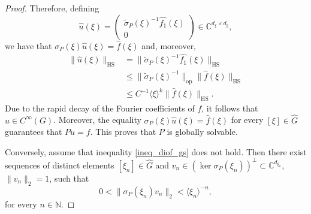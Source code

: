 \documentclass[10pt,a4paper]{amsart}
\newcommand{\C}{\mathbb{C}}
\newcommand{\HS}{\operatorname{HS}}
\newcommand{\N}{\mathbb{N}}
\begin{document}
\begin{proof}
Therefore, defining
\begin{equation*}
    \widehat{u}(\xi)=\begin{pmatrix}
        \tilde \sigma_P(\xi)^{-1}\widehat{f_1}(\xi)\\
        0
    \end{pmatrix}\in\C^{d_\xi\times d_\xi},
\end{equation*}
we have that $\sigma_P(\xi)\widehat{u}(\xi)=\widehat{f}(\xi)$ and, moreover,
\begin{align*}
    \|\widehat{u}(\xi)\|_{\HS}&=\| \tilde \sigma_P(\xi)^{-1}\widehat{f_1}(\xi)\|_{\HS}\\
    &\leq \| \tilde \sigma_P(\xi)^{-1}\|_{\operatorname{op}}\|\widehat{f}(\xi)\|_{\HS}\\
    &\leq C^{-1}\langle \xi \rangle^{k}\|\widehat{f}(\xi)\|_{\HS}.
\end{align*}
Due to the rapid decay of the Fourier coefficients of $f$, it follows that $u\in C^\infty(G)$. Moreover, the equality $\sigma_P(\xi)\widehat{u}(\xi)=\widehat{f}(\xi)$ for every $[\xi]\in\widehat{G}$ guarantees that $Pu=f$. This proves that $P$ is globally solvable.

Conversely, assume that inequality \eqref{ineq_diof_gs} does not hold. Then there exist sequences of distinct elements $[\xi_n]\in\widehat{G}$ and $v_{n}\in (\ker \sigma_P(\xi_n))^\perp\subset \C^{d_{\xi_n}}$, $\|v_n\|_2=1$, such that
\begin{equation*}
  0< \| \sigma_P(\xi_n)v_n\|_2<\langle \xi_n \rangle ^{-n},
\end{equation*}
for every $n\in\N$.


\end{proof}
\end{document}
